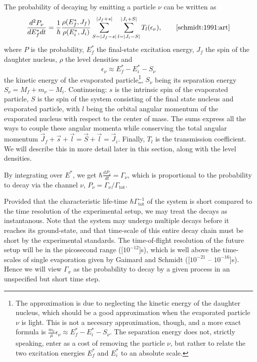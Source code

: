 The probability of decaying by emitting a particle $\nu$ can be written as
\begin{equation}
\frac{d^2 P_\nu}{dE_f^* dt} = \frac{1}{\hbar} \frac{\rho(E_f^*,J_f)}{\rho(E_i^*,J_i)} \sum_{S=|J_f-s|}^{|J_f+s|}\sum_{l=|J_i-S|}^{|J_i+S|} T_l(\epsilon_\nu),\qquad\cite{schmidt:1991:art}\label{eq:ew}
\end{equation}
where $P$ is the probability, $E_f^*$ the final-state excitation energy, $J_f$ the spin of the daughter nucleus, $\rho$ the level densities and 
\begin{equation}
\epsilon_\nu \approx E_f^*-E_i^*-S_\nu\label{eq:kine}
\end{equation}
the kinetic energy of the evaporated particle\footnote{The approximation is due to neglecting the kinetic energy of the daughter nucleus, which should be a good approximation when the evaporated particle $\nu$ is light. This is not a necesary approximation, though, and a more exact formula is $\tfrac{m_\nu}{\mu}\epsilon_\nu \approx E_f^*-E_i^*-S_\nu$. The separation energy does not, strictly speaking, enter as a cost of removing the particle $\nu$, but rather to relate the two excitation energies $E_f^*$ and $E_i^*$ to an absolute scale.}, $S_\nu$ being its separation energy $S_\nu = M_f + m_\nu - M_i$. 
 Continueing: $s$ is the intrinsic spin of the evaporated particle, $S$ is the spin of the system consisting of the final state nucleus and evaporated particle, with $l$ being the orbital angular momentum of the evaporated nucleus with respect to the center of mass. The sums express all the ways to couple these angular momenta while conserving the total angular momentum $\vec{J}_f+\vec{s} +\vec{l}= \vec{S} +\vec{l}= \vec{J}_i$. Finally, $T_l$ is the transmission coefficient. We will describe this in more detail later in this section, along with the level densities.%

By integrating over $E^*$, we get $\hbar \frac{d P_\nu}{dt} = \Gamma_\nu$, which is proportional to the probability to decay via the channel $\nu$, $P_\nu = \Gamma_\nu/\Gamma_{\text{tot}}$. 

Provided that the characteristic life-time $\hbar\Gamma_\text{tot}^{-1}$ of the system is short compared to the time resolution of the experimental setup, we may treat the decays as instantanous. Note that the system may undergo multiple decays before it reaches its ground-state, and that time-scale of this entire decay chain must be short by the experimental standards. 
The time-of-flight resolution of the future \rtb{} setup will be in the picosecond range (\unit[$10^{-12}$]{s})\cite{r3b:online}, which is well above the time-scales of single evaporation given by Gaimard and Schmidt (\unit[$10^{-21}$ -- $10^{-16}$]{s})\cite{gaimard:1991:art}. Hence we will view $\Gamma_x$ as the probability to decay by a given process in an unspecified but short time step.


